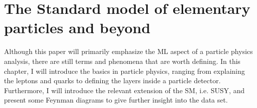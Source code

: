 \chapter{The Standard model of elementary particles and beyond}
Although this paper will primarily emphasize the \ac{ML} aspect of a particle physics analysis, there are still terms and phenomena that are worth defining.
In this chapter, I will introduce the basics in particle physics, ranging from explaining the leptons and quarks to defining the layers inside a 
particle detector. Furthermore, I will introduce the relevant extension of the \ac{SM}, i.e. \ac{SUSY}, and present some Feynman diagrams 
to give further insight into the data set.
